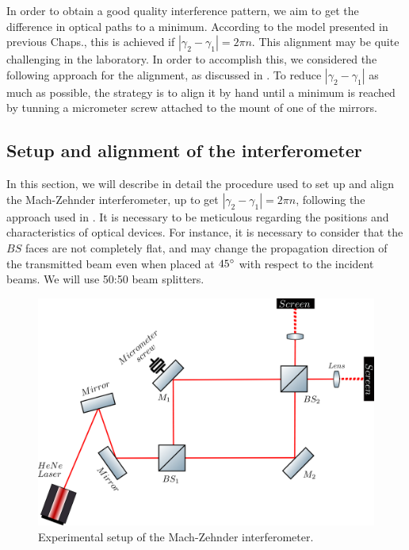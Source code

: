 \documentclass[12pt]{book}
\begin{document}
In order to obtain a good quality interference pattern, we aim to get the difference in optical paths to a minimum. According to the model presented in previous Chaps., this is achieved if $|\gamma_{2}-\gamma_{1}|=2\pi n$. This alignment may be quite challenging in the laboratory. In order to accomplish this, we considered the following approach for the alignment, as discussed in \cite{zuri}. To reduce $|\gamma_{2}-\gamma_{1}|$ as much as possible, the strategy is to align it by hand until a minimum is reached by tunning a micrometer screw attached to the mount of one of the mirrors.



\subsection{Setup and alignment of the interferometer}

In this section, we will describe in detail the procedure used to set up and align the Mach-Zehnder interferometer, up to get $|\gamma_{2}-\gamma_{1}|=2\pi n$, following the approach used in \cite{zuri}. It is necessary to be meticulous regarding the positions and characteristics of optical devices. For instance, it is necessary to consider that the $BS$ faces are not completely flat, and may change the propagation direction of the transmitted beam even when placed at $45\degree$ with respect to the incident beams. We will use 50:50 beam splitters.

\begin{figure}[t!]
\centering
\includegraphics[scale=0.4]{images/mach_sara.png}
\caption{Experimental setup of the Mach-Zehnder interferometer.}
\label{newnewsingle}
\end{figure}
\end{document}
